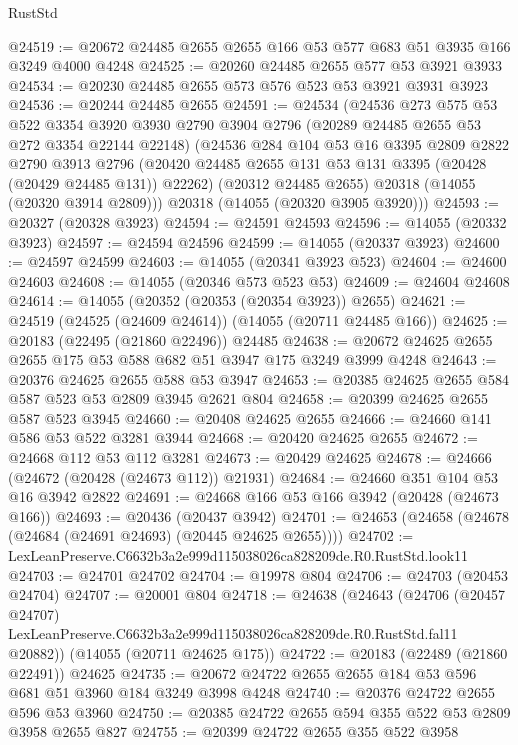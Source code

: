 \begin{lexlean}{RustStd}
\begin{coremodule}
@24519 := @20672 @24485 @2655 @2655 @166 @53 @577 @683 @51 @3935 @166 @3249 @4000 @4248
@24525 := @20260 @24485 @2655 @577 @53 @3921 @3933
@24534 := @20230 @24485 @2655 @573 @576 @523 @53 @3921 @3931 @3923
@24536 := @20244 @24485 @2655
@24591 := @24534
    (@24536
      @273
      @575
      @53
      @522
      @3354
      @3920
      @3930
      @2790
      @3904
      @2796
      (@20289 @24485 @2655 @53 @272 @3354 @22144 @22148)
      (@24536
        @284
        @104
        @53
        @16
        @3395
        @2809
        @2822
        @2790
        @3913
        @2796
        (@20420 @24485 @2655 @131 @53 @131 @3395 (@20428 (@20429 @24485 @131)) @22262)
        (@20312 @24485 @2655)
        @20318
        (@14055 (@20320 @3914 @2809)))
      @20318
      (@14055 (@20320 @3905 @3920)))
@24593 := @20327 (@20328 @3923)
@24594 := @24591 @24593
@24596 := @14055 (@20332 @3923)
@24597 := @24594 @24596
@24599 := @14055 (@20337 @3923)
@24600 := @24597 @24599
@24603 := @14055 (@20341 @3923 @523)
@24604 := @24600 @24603
@24608 := @14055 (@20346 @573 @523 @53)
@24609 := @24604 @24608
@24614 := @14055 (@20352 (@20353 (@20354 @3923)) @2655)
@24621 := @24519 (@24525 (@24609 @24614)) (@14055 (@20711 @24485 @166))
@24625 := @20183 (@22495 (@21860 @22496)) @24485
@24638 := @20672 @24625 @2655 @2655 @175 @53 @588 @682 @51 @3947 @175 @3249 @3999 @4248
@24643 := @20376 @24625 @2655 @588 @53 @3947
@24653 := @20385 @24625 @2655 @584 @587 @523 @53 @2809 @3945 @2621 @804
@24658 := @20399 @24625 @2655 @587 @523 @3945
@24660 := @20408 @24625 @2655
@24666 := @24660 @141 @586 @53 @522 @3281 @3944
@24668 := @20420 @24625 @2655
@24672 := @24668 @112 @53 @112 @3281
@24673 := @20429 @24625
@24678 := @24666 (@24672 (@20428 (@24673 @112)) @21931)
@24684 := @24660 @351 @104 @53 @16 @3942 @2822
@24691 := @24668 @166 @53 @166 @3942 (@20428 (@24673 @166))
@24693 := @20436 (@20437 @3942)
@24701 := @24653 (@24658 (@24678 (@24684 (@24691 @24693) (@20445 @24625 @2655))))
@24702 := LexLeanPreserve.C6632b3a2e999d115038026ca828209de.R0.RustStd.look11
@24703 := @24701 @24702
@24704 := @19978 @804
@24706 := @24703 (@20453 @24704)
@24707 := @20001 @804
@24718 := @24638
    (@24643
      (@24706
        (@20457 @24707)
        LexLeanPreserve.C6632b3a2e999d115038026ca828209de.R0.RustStd.fal11
        @20882))
    (@14055 (@20711 @24625 @175))
@24722 := @20183 (@22489 (@21860 @22491)) @24625
@24735 := @20672 @24722 @2655 @2655 @184 @53 @596 @681 @51 @3960 @184 @3249 @3998 @4248
@24740 := @20376 @24722 @2655 @596 @53 @3960
@24750 := @20385 @24722 @2655 @594 @355 @522 @53 @2809 @3958 @2655 @827
@24755 := @20399 @24722 @2655 @355 @522 @3958

\end{coremodule}
\end{lexlean}
